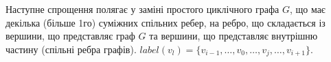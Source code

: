 \documentclass[a4paper,14pt,ukrainian]{extarticle}
\begin{document}
    Наступне спрощення полягає у заміні простого циклічного графа $G$, що має декілька (більше 1го) суміжних спільних ребер, на ребро, що складається із вершини, що представляє граф $G$ та вершини, що представляє внутрішню частину (спільні ребра графів).
    $label(v_l)=\{ v_{i-1}, \dots, v_0, \dots, v_j, \dots, v_{i+1} \}$.

    \begin{figure}[h]
        \centering
    \end{figure}
\end{document}
